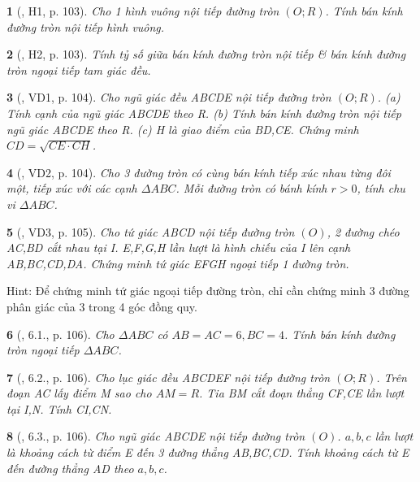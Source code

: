 \documentclass{article}
\newtheorem{baitoan}{}
\begin{document}
\begin{baitoan}[\cite{Binh_boi_duong_Toan_9_tap_2}, H1, p. 103]
	Cho 1 hình vuông nội tiếp đường tròn $(O;R)$. Tính bán kính đường tròn nội tiếp hình vuông.
\end{baitoan}

\begin{baitoan}[\cite{Binh_boi_duong_Toan_9_tap_2}, H2, p. 103]
	Tính tỷ số giữa bán kính đường tròn nội tiếp \& bán kính đường tròn ngoại tiếp tam giác đều.
\end{baitoan}

\begin{baitoan}[\cite{Binh_boi_duong_Toan_9_tap_2}, VD1, p. 104]
	Cho ngũ giác đều ABCDE nội tiếp đường tròn $(O;R)$. (a) Tính cạnh của ngũ giác ABCDE theo R. (b) Tính bán kính đường tròn nội tiếp ngũ giác ABCDE theo R. (c) H là giao điểm của BD,CE. Chứng minh $CD = \sqrt{CE\cdot CH}$.
\end{baitoan}

\begin{baitoan}[\cite{Binh_boi_duong_Toan_9_tap_2}, VD2, p. 104]
	Cho 3 đường tròn có cùng bán kính tiếp xúc nhau từng đôi một, tiếp xúc với các cạnh $\Delta ABC$. Mỗi đường tròn có bánh kính $r > 0$, tính chu vi $\Delta ABC$.
\end{baitoan}

\begin{baitoan}[\cite{Binh_boi_duong_Toan_9_tap_2}, VD3, p. 105]
	Cho tứ giác ABCD nội tiếp đường tròn $(O)$, 2 đường chéo AC,BD cắt nhau tại I. E,F,G,H lần lượt là hình chiếu của I lên cạnh AB,BC,CD,DA. Chứng minh tứ giác EFGH ngoại tiếp 1 đường tròn.
\end{baitoan}
{\sf Hint}: Để chứng minh tứ giác ngoại tiếp đường tròn, chỉ cần chứng minh 3 đường phân giác của 3 trong 4 góc đồng quy.

\begin{baitoan}[\cite{Binh_boi_duong_Toan_9_tap_2}, 6.1., p. 106]
	Cho $\Delta ABC$ có $AB = AC = 6,BC = 4$. Tính bán kính đường tròn ngoại tiếp $\Delta ABC$.
\end{baitoan}

\begin{baitoan}[\cite{Binh_boi_duong_Toan_9_tap_2}, 6.2., p. 106]
	Cho lục giác đều ABCDEF nội tiếp đường tròn $(O;R)$. Trên đoạn AC lấy điểm M sao cho $AM = R$. Tia BM cắt đoạn thẳng CF,CE lần lượt tại I,N. Tính CI,CN.
\end{baitoan}

\begin{baitoan}[\cite{Binh_boi_duong_Toan_9_tap_2}, 6.3., p. 106]
	Cho ngũ giác ABCDE nội tiếp đường tròn $(O)$. $a,b,c$ lần lượt là khoảng cách từ điểm E đến 3 đường thẳng AB,BC,CD. Tính khoảng cách từ E đến đường thẳng AD theo $a,b,c$.
\end{baitoan}
\end{document}
